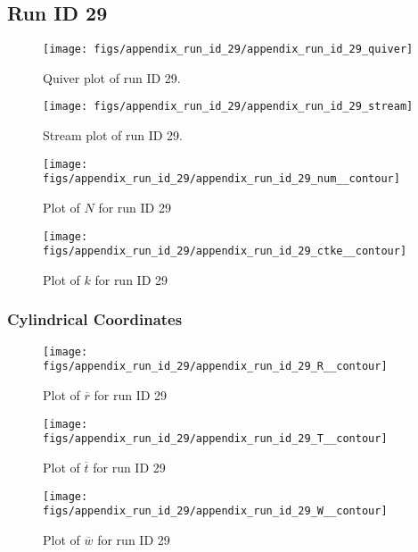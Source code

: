 \subsection{Run ID 29}
\begin{figure}[H]
\centering
\texttt{[image: figs/appendix\_run\_id\_29/appendix\_run\_id\_29\_quiver]}
\caption{Quiver plot of run ID 29.}
\label{fig:appendix_run_id_29_quiver}
\end{figure}


\begin{figure}[H]
\centering
\texttt{[image: figs/appendix\_run\_id\_29/appendix\_run\_id\_29\_stream]}
\caption{Stream plot of run ID 29.}
\label{fig:appendix_run_id_29_stream}
\end{figure}


\begin{figure}[H]
\centering
\texttt{[image: figs/appendix\_run\_id\_29/appendix\_run\_id\_29\_num\_\_contour]}
\caption{Plot of $N$ for run ID 29}
\label{fig:appendix_run_id_29_num__contour}
\end{figure}


\begin{figure}[H]
\centering
\texttt{[image: figs/appendix\_run\_id\_29/appendix\_run\_id\_29\_ctke\_\_contour]}
\caption{Plot of $k$ for run ID 29}
\label{fig:appendix_run_id_29_ctke__contour}
\end{figure}


\subsubsection{Cylindrical Coordinates}
\begin{figure}[H]
\centering
\texttt{[image: figs/appendix\_run\_id\_29/appendix\_run\_id\_29\_R\_\_contour]}
\caption{Plot of $\overline{r}$ for run ID 29}
\label{fig:appendix_run_id_29_R__contour}
\end{figure}


\begin{figure}[H]
\centering
\texttt{[image: figs/appendix\_run\_id\_29/appendix\_run\_id\_29\_T\_\_contour]}
\caption{Plot of $\overline{t}$ for run ID 29}
\label{fig:appendix_run_id_29_T__contour}
\end{figure}


\begin{figure}[H]
\centering
\texttt{[image: figs/appendix\_run\_id\_29/appendix\_run\_id\_29\_W\_\_contour]}
\caption{Plot of $\overline{w}$ for run ID 29}
\label{fig:appendix_run_id_29_W__contour}
\end{figure}


